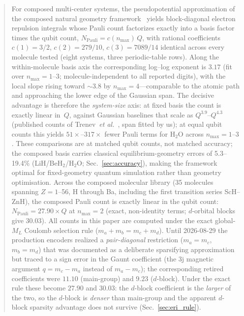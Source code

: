 \documentclass[aps,pra,twocolumn,superscriptaddress,longbibliography]{revtex4-2}
\newcommand{\gvq}[2]{#2}
\begin{document}
\begin{abstract}
For composed multi-center systems, the
pseudopotential approximation of the composed natural geometry
framework~\cite{loutey_paper17} yields block-diagonal electron
repulsion integrals whose Pauli count factorizes exactly into a
basis factor times the qubit count, $N_{\mathrm{Pauli}} =
c(n_{\max})\,Q$, with rational coefficients $c(1) = 3/2$,
$c(2) = 279/10$, $c(3) = 7089/14$ identical across every molecule
tested (eight systems, three periodic-table rows).  Along the
within-molecule basis axis the corresponding log--log exponent is
$3.17$ (fit over $n_{\max} = 1$--$3$; molecule-independent to all
reported digits), with the local slope rising toward $\sim 3.8$ by
$n_{\max} = 4$---comparable to the atomic path and approaching the
lower edge of the Gaussian span.  The decisive advantage is therefore
the \emph{system-size} axis: at fixed basis the count is exactly
linear in~$Q$, against Gaussian baselines that scale as
$Q^{3.9}$--$Q^{4.3}$ (published counts of
Trenev~\textit{et al.}~\cite{trenev2025}, span fitted by us); at equal
qubit counts this yields $51\times$--$317\times$ fewer Pauli terms for
H$_2$O across $n_{\max} = 1$--$3$.  These comparisons are at matched
qubit counts, not matched accuracy; the composed basis carries
classical equilibrium-geometry errors of 5.3--19.4\% (LiH/BeH$_2$/H$_2$O;
Sec.~\ref{sec:accuracy}), making the framework optimal for fixed-geometry
quantum simulation rather than geometry optimisation.
Across the composed molecular library (35 molecules spanning
$Z = 1$--56, H through Ba, including the first transition series ScH--ZnH), the composed
Pauli count is exactly linear in the qubit count:
$N_{\mathrm{Pauli}} = \gvq{composed_coeff}{27.90} \times Q$ at $n_{\max} = 2$ (exact, non-identity
terms; $d$-orbital blocks give 30.03).  All counts in this paper are computed
under the exact global-$M_L$ Coulomb selection rule
($m_a + m_b = m_c + m_d$).  Until 2026-08-29 the production encoders realized
a \emph{pair-diagonal} restriction ($m_a=m_c$, $m_b=m_d$) that was documented
as a deliberate sparsifying approximation but traced to a sign error in the
Gaunt coefficient (the 3j magnetic argument $q = m_c - m_a$ instead of
$m_a - m_c$); the corresponding retired coefficients were $11.10$
(main-group) and $9.23$ ($d$-block).  Under the exact rule these become
$\gvq{composed_coeff}{27.90}$ and $\gvq{composed_coeff_d}{30.03}$: the $d$-block coefficient is the \emph{larger} of the
two, so the $d$-block is \emph{denser} than main-group and the apparent
$d$-block sparsity advantage does not survive (Sec.~\ref{sec:eri_rule}).
\end{abstract}
\end{document}
